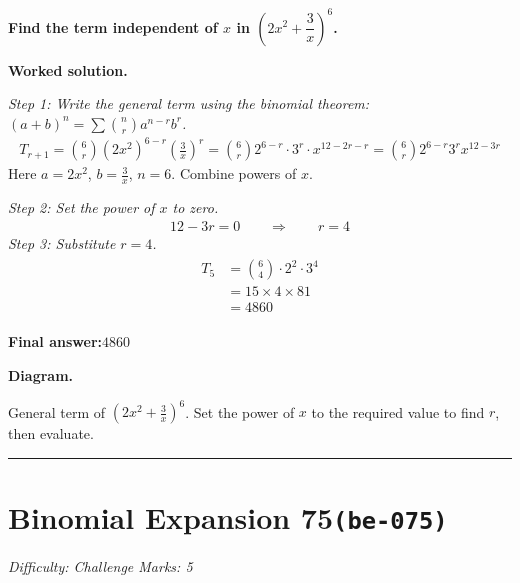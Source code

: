 \documentclass[11pt]{article}
\newcommand{\question}[1]{\par\medskip\noindent\textbf{#1}\par}
\begin{document}
\question{Find the term independent of \( x \) in \( \left(2x^2 + \dfrac{3}{x}\right)^6 \).}

\textbf{Worked solution.}

\textit{Step 1: Write the general term using the binomial theorem: \((a+b)^n = \sum \binom{n}{r} a^{n-r} b^r\).}
\[\begin{gathered}
T_{r+1} = \binom{6}{r}(2x^2)^{6-r}\left(\frac{3}{x}\right)^r = \binom{6}{r} 2^{6-r} \cdot 3^r \cdot x^{12-2r-r} = \binom{6}{r} 2^{6-r} 3^r x^{12-3r}
\end{gathered}\]
Here \(a = 2x^2\), \(b = \frac{3}{x}\), \(n = 6\). Combine powers of \(x\).

\textit{Step 2: Set the power of \(x\) to zero.}
\[\begin{gathered}
12 - 3r = 0 \quad\quad \Rightarrow \quad\quad r = 4
\end{gathered}\]
\textit{Step 3: Substitute \(r = 4\).}
\[\begin{gathered}
\begin{aligned} T_5 &= \binom{6}{4} \cdot 2^2 \cdot 3^4 \\ &= 15 \times 4 \times 81 \\ &= 4860 \end{aligned}
\end{gathered}\]
\begin{answerbox}
\textbf{Final answer:}\quad \(\displaystyle 4860\)
\end{answerbox}
\textbf{Diagram.}

\begin{center}
\end{center}
\small General term of $\left(2x^{2}+\frac{3}{x}\right)^{6}$. Set the power of $x$ to the required value to find $r$, then evaluate.\normalsize

\medskip\hrule

\section*{Binomial Expansion 75\quad\small\texttt{(be-075)}}
\textit{Difficulty: Challenge \quad\textbar\quad Marks: 5}
\end{document}
